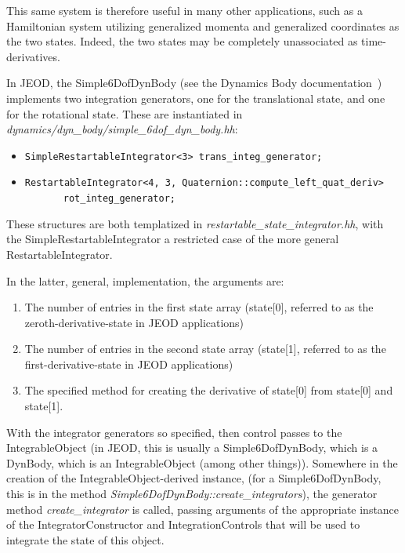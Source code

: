 This same system is therefore useful in many other applications, such as a 
Hamiltonian system utilizing generalized momenta and generalized coordinates 
as the two states.  Indeed, the two states may be completely unassociated as 
time-derivatives.

In JEOD, the Simple6DofDynBody (see the Dynamics Body 
documentation~\cite{dynenv:DYNBODY}) implements two 
integration generators, one for the translational state, and one for the 
rotational state.  These are instantiated in 
\textit{dynamics/dyn\_body/simple\_6dof\_dyn\_body.hh}:
\begin{itemize}
 \item \verb+SimpleRestartableIntegrator<3> trans_integ_generator;+
 \item \verb+RestartableIntegrator<4, 3, Quaternion::compute_left_quat_deriv>+ 
        \newline \ \ \ \ \ \ \ \verb+rot_integ_generator;+
\end{itemize}

These structures are both templatized in 
\textit{restartable\_state\_integrator.hh}, with the 
SimpleRestartableIntegrator 
a restricted case of the more general RestartableIntegrator.

In the latter, general, implementation, the arguments are:
\begin{enumerate}
 \item The number of entries in the first state array (state[0], referred to 
 as the zeroth-derivative-state in JEOD applications)
 \item The number of entries in the second state array (state[1], referred to 
 as the first-derivative-state in JEOD applications)
 \item The specified method for creating the derivative of state[0] from 
 state[0] and state[1].
\end{enumerate}

With the integrator generators so specified, then control passes to the 
IntegrableObject (in JEOD, this is usually a Simple6DofDynBody, which is a 
DynBody, which is an IntegrableObject (among other things)).  Somewhere in the 
creation of the IntegrableObject-derived instance, (for a Simple6DofDynBody, 
this is in the method \textit{Simple6DofDynBody::create\_integrators}), the 
generator method \textit{create\_integrator} is called, passing arguments of 
the appropriate instance of the IntegratorConstructor and IntegrationControls 
that will be used to integrate the state of this object.

